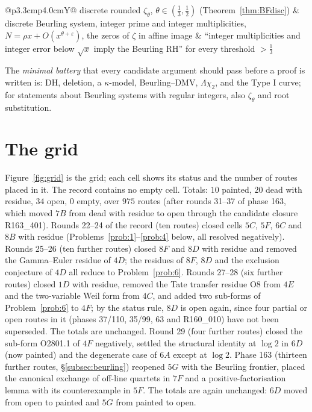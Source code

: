 \documentclass[11pt]{amsart}
\theoremstyle{definition}
\theoremstyle{remark}
\begin{document}
\begin{table}[ht]
\begin{tabularx}{\textwidth}{@{}p{3.3cm}p{4.0cm}Y@{}}
discrete rounded $\zeta_\theta$, $\theta\in(\frac13,\frac12)$ (Theorem~\ref{thm:BFdisc}) & discrete Beurling system, integer prime and integer multiplicities, $N=\rho x+O(x^{\theta+\varepsilon})$, the zeros of $\zeta$ in affine image & ``integer multiplicities and integer error below $\sqrt x$ imply the Beurling RH'' for every threshold $>\frac13$ \\
\bottomrule
\end{tabularx}
\end{table}

The \emph{minimal battery} that every candidate argument should pass before a proof is written is: DH,
deletion, a $\kappa$-model, Beurling--DMV, $\Lambda\chi_2$, and the Type I curve; for statements about Beurling systems with regular integers, also $\zeta_\theta$ and root substitution.

\section{The grid}\label{sec:grid}

Figure~\ref{fig:grid} is the grid; each cell shows its status and the number of routes placed in it.
The record contains no empty cell. Totals: $10$ painted, $20$ dead with residue, $34$ open, $0$ empty, over $975$ routes (after rounds 31--37 of phase 163, which moved $7B$ from dead with residue to open through the candidate closure R163\_401). Rounds 22--24 of the record (ten routes) closed cells $5C$, $5F$, $6C$ and $8B$ with residue (Problems~\ref{prob:1}--\ref{prob:4} below, all resolved negatively). Rounds 25--26 (ten further routes) closed $8F$ and $8D$ with residue and removed the Gamma--Euler residue of $4D$; the residues of $8F$, $8D$ and the exclusion conjecture of $4D$ all reduce to Problem~\ref{prob:6}. Rounds 27--28 (six further routes) closed $1D$ with residue, removed the Tate transfer residue O8 from $4E$ and the two-variable Weil form from $4C$, and added two sub-forms of Problem~\ref{prob:6} to $4F$; by the status rule, $8D$ is open again, since four partial or open routes in it (phases 37/110, 35/99, 63 and R160\_010) have not been superseded. The totals are unchanged. Round 29 (four further routes) closed the sub-form O2801.1 of $4F$ negatively, settled the structural identity at $\log2$ in $6D$ (now painted) and the degenerate case of $6A$ except at $\log2$. Phase 163 (thirteen further routes, \S\ref{subsec:beurling}) reopened $5G$ with the Beurling frontier, placed the canonical exchange of off-line quartets in $7F$ and a positive-factorisation lemma with its counterexample in $5F$. The totals are again unchanged: $6D$ moved from open to painted and $5G$ from painted to open.
\end{document}
